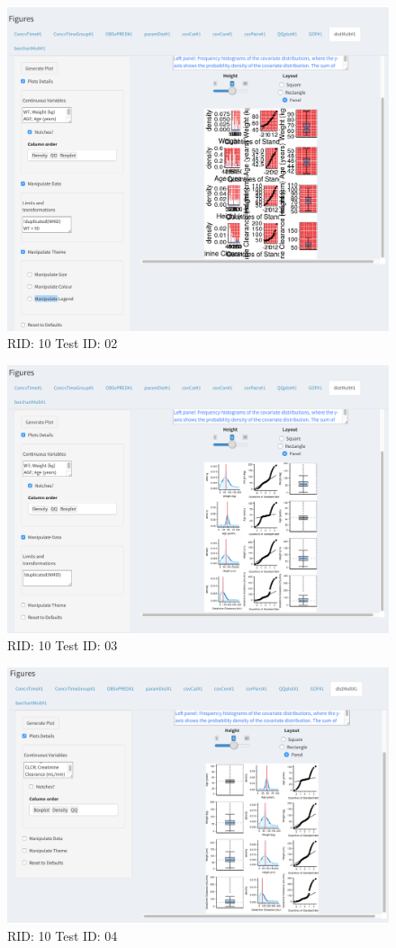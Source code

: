 \begin{figure}[H]
\includegraphics[width=.8\textwidth]{screencaps/10-02-1.png}
\caption{RID: 10 Test ID: 02}
\end{figure}
\begin{figure}[H]
\includegraphics[width=.8\textwidth]{screencaps/10-03-1.png}
\caption{RID: 10 Test ID: 03}
\end{figure}
\begin{figure}[H]
\includegraphics[width=.8\textwidth]{screencaps/10-04-1.png}
\caption{RID: 10 Test ID: 04}
\end{figure}
